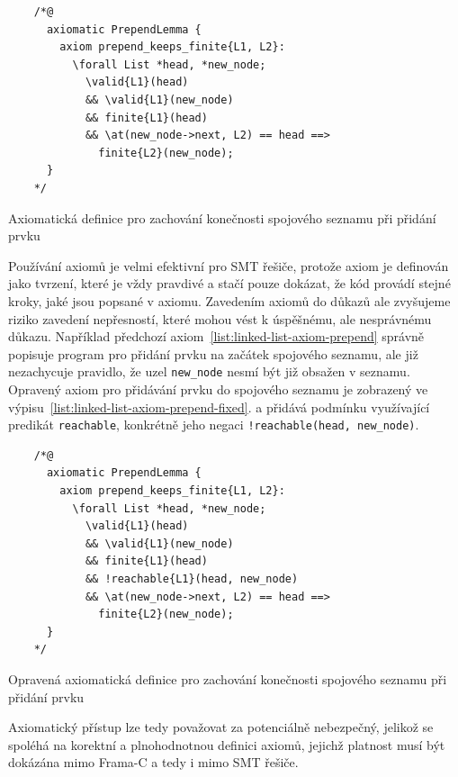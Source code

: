 \begin{listing}[H]
    \begin{verbatim}
    /*@
      axiomatic PrependLemma {
        axiom prepend_keeps_finite{L1, L2}:
          \forall List *head, *new_node;
            \valid{L1}(head)
            && \valid{L1}(new_node)
            && finite{L1}(head)
            && \at(new_node->next, L2) == head ==>
              finite{L2}(new_node);
      }
    */
    \end{verbatim}
    \caption{Axiomatická definice pro zachování konečnosti spojového seznamu při přidání prvku}
    \label{list:linked-list-axiom-prepend}
\end{listing}

Používání axiomů je velmi efektivní pro SMT řešiče,
protože axiom je definován jako tvrzení, které je vždy pravdivé a stačí pouze dokázat,
že kód provádí stejné kroky, jaké jsou popsané v axiomu.
Zavedením axiomů do důkazů ale zvyšujeme riziko zavedení nepřesností,
které mohou vést k úspěšnému, ale nesprávnému důkazu.
Například předchozí axiom~\ref{list:linked-list-axiom-prepend} správně popisuje
program pro přidání prvku na začátek spojového seznamu,
ale již nezachycuje pravidlo, že uzel \texttt{new\_node} nesmí být již obsažen v seznamu.
Opravený axiom pro přidávání prvku do spojového seznamu
je zobrazený ve výpisu~\ref{list:linked-list-axiom-prepend-fixed}.
a přidává podmínku využívající predikát \texttt{reachable},
konkrétně jeho negaci \texttt{!reachable(head, new\_node)}.

\begin{listing}[H]
    \begin{verbatim}
    /*@
      axiomatic PrependLemma {
        axiom prepend_keeps_finite{L1, L2}:
          \forall List *head, *new_node;
            \valid{L1}(head)
            && \valid{L1}(new_node)
            && finite{L1}(head)
            && !reachable{L1}(head, new_node)
            && \at(new_node->next, L2) == head ==>
              finite{L2}(new_node);
      }
    */
    \end{verbatim}
    \caption{Opravená axiomatická definice pro zachování konečnosti spojového seznamu při přidání prvku}
    \label{list:linked-list-axiom-prepend-fixed}
\end{listing}

Axiomatický přístup lze tedy považovat za potenciálně nebezpečný,
jelikož se spoléhá na korektní a plnohodnotnou definici axiomů,
jejichž platnost musí být dokázána mimo Frama\mbox{-}C a tedy i mimo SMT řešiče.

